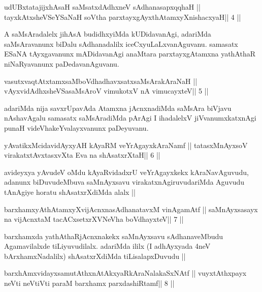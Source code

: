 \begin{shl}
udUBxtatajijxhAsaH saMsatxdAdhxneV sAdhanasapxqqhaH ||
tayxkAtxsheVSeYSaNaH soV\s tha parxtayxgAyxthAtamxyXnishacxyaH\hfill || 4 ||
\end{shl}

\begin{artha}
A saMsAradalelx jihAsA budidhxyiMda kUDidavanAgi, adariMda
saMsAravanunx biDalu sAdhanadalilx iceCxyuLaLxvanAguvanu.
samasatx ESaNA tAyxgavanunx mADidavanAgi anaMtara parxtayxgAtamxna
yathAthaR niNaRyavanunx paDedavanAguvanu. 
\end{artha}

\begin{shl}
vasutxvaqtAtxtamxsaMboVdhadhavxsatxsaMsArakAraNaH ||
vAyxvidAdhxsheVSasaMsAroV vimukotxV nA vimucayxteV\hfill || 5 ||
\end{shl}

\begin{artha}
adariMda nija savxrUpavAda Atamxna jAcnxnadiMda saMsAra biVjavu
nAshavAgalu samasatx saMsAradiMda pArAgi I ihadalelxV jiVvanumxkatxnAgi
punaH videVhakeYvalayxvanunx paDeyuvanu. 
\end{artha}

\begin{shl}
yAvatikxMcidavidAyxyAH kAyaRM veYrAgayxkAraNamf ||
tatasxMnAyxsoV virakatxtAvxtasxvXta Eva na shAsatxrXtaH\hfill || 6 ||
\end{shl}

\begin{artha}
avideyxya yAvudeV oMdu kAyaRvidadxrU veYrAgayxkekx kAraNavAguvudu,
adanunx biDuvudeMbuva saMnAyxsavu virakatxnAgiruvudariMda Aguvudu
tAnAgiye horatu shAsatxrXdiMda alalx ||
\end{artha}

\begin{shl}
barxhamxyAthAtamxyXvijAcnxnasAdhanatavxM vinA\s\s gamAtf ||
saMnAyxsasayx na vijAcnxtaM tacACxsetxrXVNeVha boVdhayxteV\hfill || 7 ||
\end{shl}

\begin{artha}
barxhamxda yathAthaRjAcnxnakekx saMnAyxsavu sAdhanaveMbudu
Agamavilalxde tiLiyuvudilalx. adariMda ililx (I adhAyxyada 4neV
bArxhamxNadalilx) shAsatxrXdiMda tiLisalapxDuvudu ||
\end{artha}


\begin{shl}
barxhAmxvidayxsamutAthxnAtAkxyaRkAraNalakaSxNAtf ||
vuyxtAthxpayx neVti neVtiVti paraM barxhamx parxdashiRtamf\hfill || 8 ||
\end{shl}

